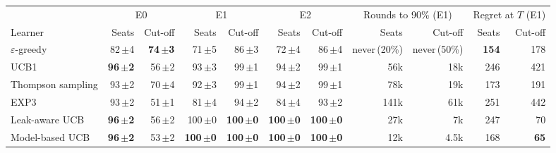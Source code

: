 \begin{tabular}{@{}lrrrrrrrrrr@{}}
\toprule
 & \multicolumn{2}{c}{E0} & \multicolumn{2}{c}{E1} & \multicolumn{2}{c}{E2} & \multicolumn{2}{c}{Rounds to 90\% (E1)} & \multicolumn{2}{c}{Regret at $T$ (E1)} \\
\cmidrule(lr){2-3}\cmidrule(lr){4-5}\cmidrule(lr){6-7}\cmidrule(lr){8-9}\cmidrule(lr){10-11}
Learner & Seats & Cut-off & Seats & Cut-off & Seats & Cut-off & Seats & Cut-off & Seats & Cut-off \\
\midrule
$\varepsilon$-greedy & 82\,{\scriptsize$\pm$4} & \textbf{74\,{\scriptsize$\pm$3}} & 71\,{\scriptsize$\pm$5} & 86\,{\scriptsize$\pm$3} & 72\,{\scriptsize$\pm$4} & 86\,{\scriptsize$\pm$4} & never\,(20\%) & never\,(50\%) & \textbf{154} & 178 \\
UCB1 & \textbf{96\,{\scriptsize$\pm$2}} & 56\,{\scriptsize$\pm$2} & 93\,{\scriptsize$\pm$3} & 99\,{\scriptsize$\pm$1} & 94\,{\scriptsize$\pm$2} & 99\,{\scriptsize$\pm$1} & 56k & 18k & 246 & 421 \\
Thompson sampling & 93\,{\scriptsize$\pm$2} & 70\,{\scriptsize$\pm$4} & 92\,{\scriptsize$\pm$3} & 99\,{\scriptsize$\pm$1} & 94\,{\scriptsize$\pm$2} & 99\,{\scriptsize$\pm$1} & 78k & 19k & 173 & 191 \\
EXP3 & 93\,{\scriptsize$\pm$2} & 51\,{\scriptsize$\pm$1} & 81\,{\scriptsize$\pm$4} & 94\,{\scriptsize$\pm$2} & 84\,{\scriptsize$\pm$4} & 93\,{\scriptsize$\pm$2} & 141k & 61k & 251 & 442 \\
Leak-aware UCB & \textbf{96\,{\scriptsize$\pm$2}} & 56\,{\scriptsize$\pm$2} & 100\,{\scriptsize$\pm$0} & \textbf{100\,{\scriptsize$\pm$0}} & \textbf{100\,{\scriptsize$\pm$0}} & \textbf{100\,{\scriptsize$\pm$0}} & 27k & 7k & 247 & 70 \\
Model-based UCB & \textbf{96\,{\scriptsize$\pm$2}} & 53\,{\scriptsize$\pm$2} & \textbf{100\,{\scriptsize$\pm$0}} & \textbf{100\,{\scriptsize$\pm$0}} & \textbf{100\,{\scriptsize$\pm$0}} & \textbf{100\,{\scriptsize$\pm$0}} & 12k & 4.5k & 168 & \textbf{65} \\
\bottomrule
\end{tabular}
